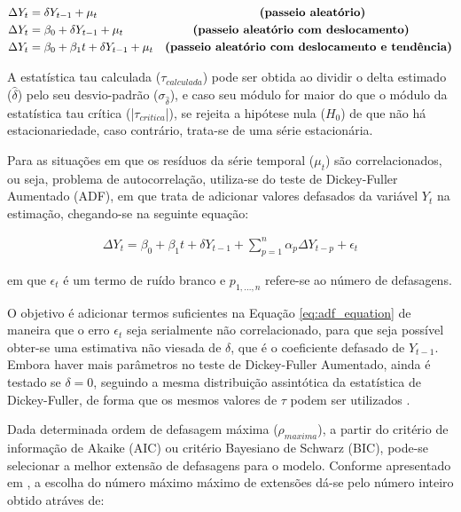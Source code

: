 \begin{ceqn}
\begin{align} \label{eq:df_equations}
&\Delta Y_{t} = \delta Y_{t-1} + \mu_{t} \qquad \qquad \qquad \qquad \qquad \qquad \qquad \text{\textbf{(passeio aleatório)}} \\
&\Delta Y_{t} = \beta_{0} + \delta Y_{t-1} + \mu_{t} \qquad \qquad \qquad \text{\textbf{(passeio aleatório com deslocamento)}} \\
&\Delta Y_{t} = \beta_{0} + \beta_{1} t + \delta Y_{t-1} + \mu_{t} \quad \text{\textbf{(passeio aleatório com deslocamento e tendência)}} 
\end{align}
\end{ceqn}

A estatística tau calculada ($\tau_{calculada}$) pode ser obtida ao dividir o delta estimado ($\hat{\delta}$) pelo seu desvio-padrão ($\sigma_{\hat{\delta}}$), e caso seu módulo for maior do que o módulo da estatística tau crítica (|$\tau_{critica}$|), se rejeita a hipótese nula ($H_{0}$) de que não há estacionariedade, caso contrário, trata-se de uma série estacionária.

Para as situações em que os resíduos da série temporal ($\mu_{t}$) são correlacionados, ou seja, problema de autocorrelação, utiliza-se do teste de Dickey-Fuller Aumentado (ADF), em que trata de adicionar valores defasados da variável $Y_{t}$ na estimação, chegando-se na seguinte equação:

\begin{ceqn}
\begin{align} \label{eq:adf_equation}
\Delta Y_{t} = \beta_{0} + \beta_{1} t + \delta Y_{t-1} + \sum_{p=1}^{n}{\alpha_{p} \Delta Y_{t-p}} + \epsilon_{t}
\end{align}
\end{ceqn} em que $\epsilon_{t}$ é um termo de ruído branco e $p_{1,...,n}$ refere-se ao número de defasagens. 

O objetivo é adicionar termos suficientes na Equação \eqref{eq:adf_equation} de maneira que o erro $\epsilon_{t}$ seja serialmente não correlacionado, para que seja possível obter-se uma estimativa não viesada de $\delta$, que é o coeficiente defasado de $Y_{t-1}$. Embora haver mais parâmetros no teste de Dickey-Fuller Aumentado, ainda é testado se $\delta = 0$, seguindo a mesma distribuição assintótica da estatística de Dickey-Fuller, de forma que os mesmos valores de $\tau$ podem ser utilizados \cite{gujarati_ecn2011}.

Dada determinada ordem de defasagem máxima ($\rho_{maxima}$), a partir do critério de informação de Akaike (AIC) ou critério Bayesiano de Schwarz (BIC), pode-se selecionar a melhor extensão de defasagens para o modelo. Conforme apresentado em , a escolha do número máximo máximo de extensões dá-se pelo número inteiro obtido atráves de:


